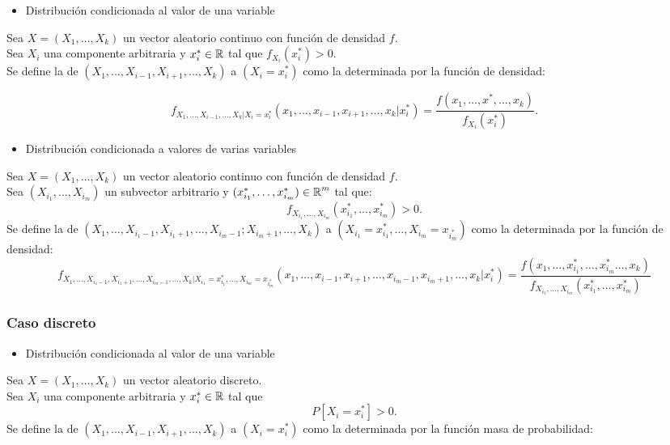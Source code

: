 \begin{itemize}[label=\color{red}\textbullet, leftmargin=*]
	\item \color{lightblue}Distribución condicionada al valor de una variable
\end{itemize}

Sea $X=(X_1,\dots,X_k)$ un vector aleatorio continuo con función de densidad $f$.\\
Sea $X_i$ una componente arbitraria y $x_i^*\in\operatorname{\mathbb{R}}$ tal que $f_{X_i}(x_i^*)>0$.\\
Se define la  de $(X_1,\dots,X_{i-1},X_{i+1},\dots,X_k)$ a $(X_i=x_i^*)$ como la determinada por la función de densidad:

\[ f_{X_1,\dots,X_{i-1},\dots,X_k|X_i=x_i^*}(x_1,\dots,x_{i-1},x_{i+1},\dots,x_k|x_i^*)=\dfrac{f(x_1,\dots,x^*,\dots,x_k)}{f_{X_i}(x_i^*)}. \]


\begin{itemize}[label=\color{red}\textbullet, leftmargin=*]
	\item \color{lightblue}Distribución condicionada a valores de varias variables
\end{itemize}
Sea $X=(X_1,\dots,X_k)$ un vector aleatorio continuo con función de densidad $f$.\\
Sea $(X_{i_1},\dots,X_{i_m})$ un subvector arbitrario y $(x_{i_1}^{*},\dots,x_{i_m}^*)\in\operatorname{\mathbb{R}}^m$ tal que: \[ f_{X_{i_1},\dots,X_{i_m}}(x_{i_1}^*,\dots,x_{i_m}^*)>0. \]
Se define la  de $(X_1,\dots,X_{i_{1}-1},X_{i_1+1},\dots,X_{i_m-1};X_{i_m+1},\dots,X_k)$ a $(X_{i_1}=x_{i_1}^*,\dots,X_{i_m}=x_{i_m^*})$ como la determinada por la función de densidad:
\[ f_{X_1,\dots,X_{i_{1}-1},X_{i_1+1},\dots,X_{i_m-1},\dots,X_k|X_{i_1}=x_{i_1}^*,\dots,X_{i_m}=x_{i_m^*}}(x_1,\dots,x_{i-1},x_{i+1},\dots,x_{i_m-1},x_{i_m+1},\dots,x_k|x_i^*)=\dfrac{f(x_1,\dots,x_{i_1}^*,\dots,x_{i_m}^*\dots,x_k)}{f_{X_{i_1},\dots,X_{i_m}}(x_{i_1}^*,\dots,x_{i_m}^*)} \]
\subsubsection{Caso discreto}
\begin{itemize}[label=\color{red}\textbullet, leftmargin=*]
	\item \color{lightblue}Distribución condicionada al valor de una variable
\end{itemize}
Sea $X=(X_1,\dots,X_k)$ un vector aleatorio discreto.\\
Sea $X_i$ una componente arbitraria y $x_i^*\in\operatorname{\mathbb{R}}$ tal que \[ P[X_i=x_i^*]>0. \]
Se define la  de $(X_1,\dots,X_{i-1},X_{i+1},\dots,X_k)$ a $(X_i=x_i^*)$ como la determinada por la función masa de probabilidad:

